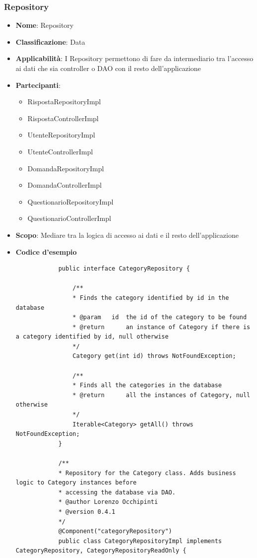 \documentclass[12pt]{article}
\begin{document}
	\subsubsection{Repository}
	\begin{itemize}
		\item \textbf{Nome}: Repository
		\item \textbf{Classificazione}: Data
		\item \textbf{Applicabilità}: I Repository permettono di fare da intermediario tra l'accesso ai dati che sia controller o DAO con il resto dell'applicazione
		\item \textbf{Partecipanti}:
		\begin{itemize}
			\item RispostaRepositoryImpl
			\item RispostaControllerImpl
			\item UtenteRepositoryImpl
			\item UtenteControllerImpl
			\item DomandaRepositoryImpl
			\item DomandaControllerImpl
			\item QuestionarioRepositoryImpl
			\item QuestionarioControllerImpl
		\end{itemize}
		\item \textbf{Scopo}: Mediare tra la logica di accesso ai dati e il resto dell'applicazione
		\item \textbf{Codice d'esempio}
		\begin{lstlisting}
			public interface CategoryRepository {
				
				/**
				* Finds the category identified by id in the database
				* @param   id  the id of the category to be found
				* @return      an instance of Category if there is a category identified by id, null otherwise
				*/
				Category get(int id) throws NotFoundException;
				
				/**
				* Finds all the categories in the database
				* @return      all the instances of Category, null otherwise
				*/
				Iterable<Category> getAll() throws NotFoundException;
			}
			
			/**
			* Repository for the Category class. Adds business logic to Category instances before
			* accessing the database via DAO.
			* @author Lorenzo Occhipinti
			* @version 0.4.1
			*/
			@Component("categoryRepository")
			public class CategoryRepositoryImpl implements CategoryRepository, CategoryRepositoryReadOnly {
				

\end{lstlisting}
\end{itemize}
\end{document}
